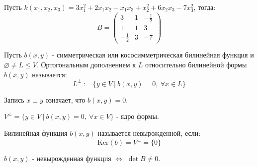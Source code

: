 \begin{example1}
    Пусть $k(x_1,x_2, x_3)=3x_1^2+2x_1x_2-x_1x_3+x_2^2+6x_2x_3-7x_3^2$, тогда:
        $$B=\begin{pmatrix}
        3 & 1 & -\frac{1}{2}\\
        1 & 1 &  3\\
        -\frac{1}{2} &  3 & -7
        \end{pmatrix}$$
\end{example1}
\begin{definition}
    Пусть $b(x,y)$ - симметрическая или кососимметрическая билинейная функция и $\varnothing \neq L\leqslant V$. Ортогональным дополнением к $L$ относительно билинейной формы $b(x,y)$ называется: 
    $$L^{\perp}:=\{y\in V \ | \ b(x,y)=0, \ \forall x\in L\}$$
\end{definition}
\begin{remark}
    Запись $x\perp y$ означает, что $b(x,y)=0$.
\end{remark}
\begin{definition}
    $V^{\perp}=\{y\in V \ | \ b(x,y)=0, \ \forall x\in V\}$ - ядро формы.
\end{definition}
\begin{definition}
    Билинейная функция $b(x,y)$ называется невырожденной, если: 
    $$\text{Ker}(b)=V^{\perp}=\{0\}$$
\end{definition}
\begin{exercise}
    $b(x,y)$ - невырожденная функция $\Longleftrightarrow$ $\det B\neq0$.
\end{exercise}
